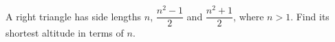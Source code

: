 A right triangle has side lengths $n$, $\dfrac{n^2-1}2$ and $\dfrac{n^2+1}2$, where $n>1$. Find its shortest altitude in terms of $n$.
